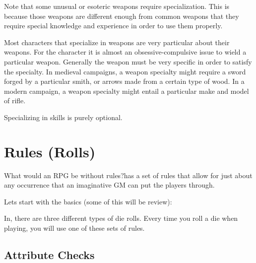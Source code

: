 \documentclass[twoside]{book}
\begin{document}
  

  

  
    {  
    Note that some unusual or esoteric weapons require specialization. This is because those weapons are different enough from common weapons that they require special knowledge and experience in order to use them properly.
    }
  
    {  
    Most characters that specialize in weapons are very particular about their weapons. For the character it is almost an obsessive-compulsive issue to wield a particular weapon. Generally the weapon must be very specific in order to satisfy the specialty. In medieval campaigns, a weapon specialty might require a sword forged by a particular smith, or arrows made from a certain type of wood. In a modern campaign, a weapon specialty might entail a particular make and model of rifle.
    }
  
    {  
    Specializing in skills is purely optional.
    }
  
    

\section{Rules (Rolls)}
    
    {  
    What would an RPG be without rules?\APATHY{}has a set of rules that allow for just about any occurrence that an imaginative GM can put the players through.
    }
  
    {  
    Lets start with the basics (some of this will be review):
    }
  
    {  
    In\APATHY{}, there are three different types of die rolls. Every time you roll a die when playing\APATHY{}, you will use one of these sets of rules.
    }
  
    

\subsection{Attribute Checks}
    
\end{document}
